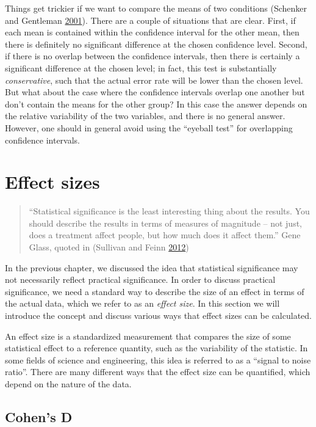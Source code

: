 \documentclass[12pt,]{book}
\theoremstyle{definition}
\theoremstyle{definition}
\theoremstyle{definition}
\theoremstyle{remark}
\begin{document}
Things get trickier if we want to compare the means of two conditions (Schenker and Gentleman \protect\hyperlink{ref-sche:gent:2001}{2001}). There are a couple of situations that are clear. First, if each mean is contained within the confidence interval for the other mean, then there is definitely no significant difference at the chosen confidence level. Second, if there is no overlap between the confidence intervals, then there is certainly a significant difference at the chosen level; in fact, this test is substantially \emph{conservative}, such that the actual error rate will be lower than the chosen level. But what about the case where the confidence intervals overlap one another but don't contain the means for the other group? In this case the answer depends on the relative variability of the two variables, and there is no general answer. However, one should in general avoid using the ``eyeball test'' for overlapping confidence intervals.

\hypertarget{effect-sizes}{%
\section{Effect sizes}\label{effect-sizes}}

\begin{quote}
``Statistical significance is the least interesting thing about the results. You should describe the results in terms of measures of magnitude -- not just, does a treatment affect people, but how much does it affect them.'' Gene Glass, quoted in (Sullivan and Feinn \protect\hyperlink{ref-Sullivan:2012ta}{2012})
\end{quote}

In the previous chapter, we discussed the idea that statistical significance may not necessarily reflect practical significance. In order to discuss practical significance, we need a standard way to describe the size of an effect in terms of the actual data, which we refer to as an \emph{effect size}. In this section we will introduce the concept and discuss various ways that effect sizes can be calculated.

An effect size is a standardized measurement that compares the size of some statistical effect to a reference quantity, such as the variability of the statistic. In some fields of science and engineering, this idea is referred to as a ``signal to noise ratio''. There are many different ways that the effect size can be quantified, which depend on the nature of the data.

\hypertarget{cohens-d}{%
\subsection{Cohen's D}\label{cohens-d}}
\end{document}
